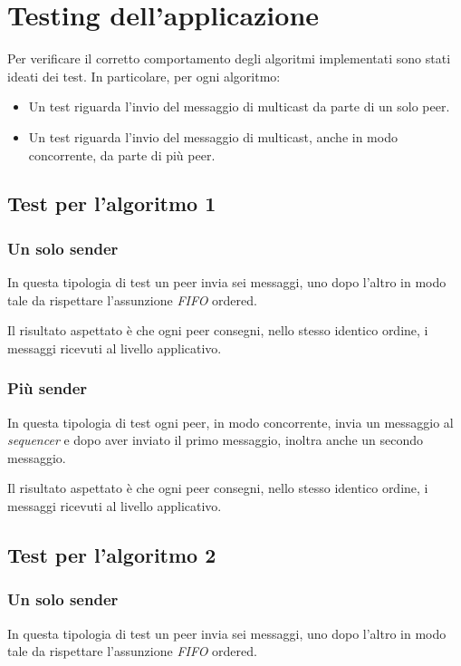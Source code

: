 \documentclass[acmtog]{acmart}
\begin{document}
\section{Testing dell'applicazione}
Per verificare il corretto comportamento degli algoritmi implementati sono stati ideati dei test. In particolare, per ogni algoritmo:
\begin{itemize}
\item Un test riguarda l'invio del messaggio di multicast da parte di un solo peer.
\item Un test riguarda l'invio del messaggio di multicast, anche in modo concorrente, da parte di più peer.
\end{itemize}

\subsection{Test per l'algoritmo 1}
\subsubsection{Un solo sender} In questa tipologia di test un peer invia sei messaggi, uno dopo l'altro in modo tale da rispettare l'assunzione \textit{FIFO} ordered.

Il risultato aspettato è che ogni peer consegni, nello stesso identico ordine, i messaggi ricevuti al livello applicativo.

\subsubsection{Più sender} In questa tipologia di test ogni peer, in modo concorrente, invia un messaggio al \textit{sequencer} e dopo aver inviato il primo messaggio, inoltra anche un secondo messaggio. 

Il risultato aspettato è che ogni peer consegni, nello stesso identico ordine, i messaggi ricevuti al livello applicativo.

\subsection{Test per l'algoritmo 2}
\subsubsection{Un solo sender} In questa tipologia di test un peer invia sei messaggi, uno dopo l'altro in modo tale da rispettare l'assunzione \textit{FIFO} ordered.
\end{document}
